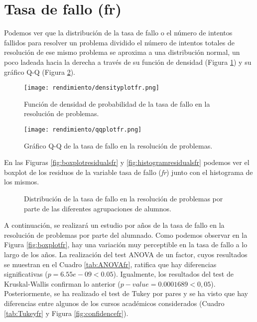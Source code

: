 \section{Tasa de fallo (fr)}

Podemos ver que la distribución de la tasa de fallo o el número de intentos fallidos para resolver un problema dividido el número de intentos totales de resolución de ese mismo problema se aproxima a una distribución normal, un poco ladeada hacia la derecha a través de su función de densidad (Figura \ref{fig:densityplotfr}) y su gráfico Q-Q (Figura \ref{fig:q-qfr}).

\begin{figure}[H]
    \centering
    \texttt{[image: rendimiento/densityplotfr.png]}
    \caption{Función de densidad de probabilidad de la tasa de fallo en la resolución de problemas.}
    \label{fig:densityplotfr}
\end{figure}

\begin{figure}[H]
    \centering
    \texttt{[image: rendimiento/qqplotfr.png]}
    \caption{Gráfico Q-Q de la tasa de fallo en la resolución de problemas.}
    \label{fig:q-qfr}
\end{figure}

En las Figuras \ref{fig:boxplotresidualsfr} y \ref{fig:histogramresidualsfr} podemos ver el boxplot de los residuos de la variable tasa de fallo (\emph{fr}) junto con el histograma de los mismos.

\begin{figure}[H]
\centering
{}\qquad
{}
\caption{Distribución de la tasa de fallo en la resolución de problemas por parte de las diferentes agrupaciones de alumnos.}
\label{fig:fr}
\end{figure}

A continuación, se realizará un estudio por años de la tasa de fallo en la resolución de problemas por parte del alumnado. Como podemos observar en la Figura \ref{fig:boxplotfr}, hay una variación muy perceptible en la tasa de fallo a lo largo de los años. La realización del test ANOVA de un factor, cuyos resultados se muestran en el Cuadro \ref{tab:ANOVAfr}, ratifica que hay diferencias significativas ($p = 6.55e-09 < 0.05$). Igualmente, los resultados del test de Kruskal-Wallis confirman lo anterior ($p-value = 0.0001689 < 0,05$). Posteriormente, se ha realizado el test de Tukey por pares y se ha visto que hay diferencias entre algunos de los cursos académicos considerados (Cuadro \ref{tab:Tukeyfr} y Figura \ref{fig:confidencefr}).

